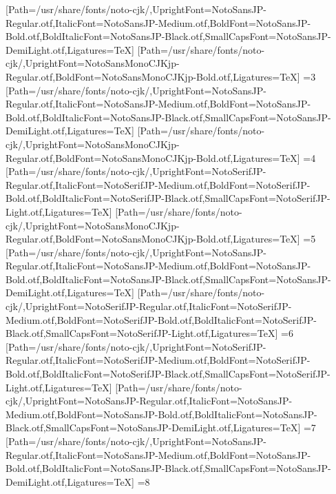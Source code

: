 [Path=/usr/share/fonts/noto-cjk/,UprightFont=NotoSansJP-Regular.otf,ItalicFont=NotoSansJP-Medium.otf,BoldFont=NotoSansJP-Bold.otf,BoldItalicFont=NotoSansJP-Black.otf,SmallCapsFont=NotoSansJP-DemiLight.otf,Ligatures=TeX]
[Path=/usr/share/fonts/noto-cjk/,UprightFont=NotoSansMonoCJKjp-Regular.otf,BoldFont=NotoSansMonoCJKjp-Bold.otf,Ligatures=TeX]
\else\ifnum\value{CJKFonts}=3
[Path=/usr/share/fonts/noto-cjk/,UprightFont=NotoSansJP-Regular.otf,ItalicFont=NotoSansJP-Medium.otf,BoldFont=NotoSansJP-Bold.otf,BoldItalicFont=NotoSansJP-Black.otf,SmallCapsFont=NotoSansJP-DemiLight.otf,Ligatures=TeX]
[Path=/usr/share/fonts/noto-cjk/,UprightFont=NotoSansMonoCJKjp-Regular.otf,BoldFont=NotoSansMonoCJKjp-Bold.otf,Ligatures=TeX]
\else\ifnum\value{CJKFonts}=4
[Path=/usr/share/fonts/noto-cjk/,UprightFont=NotoSerifJP-Regular.otf,ItalicFont=NotoSerifJP-Medium.otf,BoldFont=NotoSerifJP-Bold.otf,BoldItalicFont=NotoSerifJP-Black.otf,SmallCapsFont=NotoSerifJP-Light.otf,Ligatures=TeX]
[Path=/usr/share/fonts/noto-cjk/,UprightFont=NotoSansMonoCJKjp-Regular.otf,BoldFont=NotoSansMonoCJKjp-Bold.otf,Ligatures=TeX]
\else\ifnum\value{CJKFonts}=5
[Path=/usr/share/fonts/noto-cjk/,UprightFont=NotoSansJP-Regular.otf,ItalicFont=NotoSansJP-Medium.otf,BoldFont=NotoSansJP-Bold.otf,BoldItalicFont=NotoSansJP-Black.otf,SmallCapsFont=NotoSansJP-DemiLight.otf,Ligatures=TeX]
[Path=/usr/share/fonts/noto-cjk/,UprightFont=NotoSerifJP-Regular.otf,ItalicFont=NotoSerifJP-Medium.otf,BoldFont=NotoSerifJP-Bold.otf,BoldItalicFont=NotoSerifJP-Black.otf,SmallCapsFont=NotoSerifJP-Light.otf,Ligatures=TeX]
\else\ifnum\value{CJKFonts}=6
[Path=/usr/share/fonts/noto-cjk/,UprightFont=NotoSerifJP-Regular.otf,ItalicFont=NotoSerifJP-Medium.otf,BoldFont=NotoSerifJP-Bold.otf,BoldItalicFont=NotoSerifJP-Black.otf,SmallCapsFont=NotoSerifJP-Light.otf,Ligatures=TeX]
[Path=/usr/share/fonts/noto-cjk/,UprightFont=NotoSansJP-Regular.otf,ItalicFont=NotoSansJP-Medium.otf,BoldFont=NotoSansJP-Bold.otf,BoldItalicFont=NotoSansJP-Black.otf,SmallCapsFont=NotoSansJP-DemiLight.otf,Ligatures=TeX]
\else\ifnum\value{CJKFonts}=7
[Path=/usr/share/fonts/noto-cjk/,UprightFont=NotoSansJP-Regular.otf,ItalicFont=NotoSansJP-Medium.otf,BoldFont=NotoSansJP-Bold.otf,BoldItalicFont=NotoSansJP-Black.otf,SmallCapsFont=NotoSansJP-DemiLight.otf,Ligatures=TeX]
\else\ifnum\value{CJKFonts}=8
